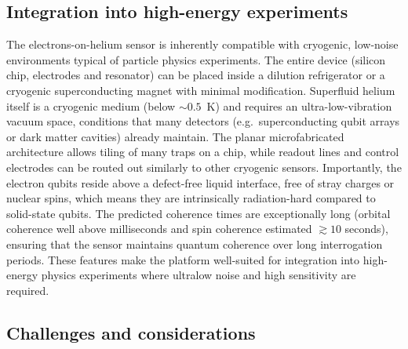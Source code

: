\documentclass[fleqn,10pt]{wlscirep}
\begin{document}
\subsection{Integration into high-energy experiments}

The electrons-on-helium sensor is inherently compatible with cryogenic, low-noise environments typical of particle physics experiments.  The entire device (silicon chip, electrodes and resonator) can be placed inside a dilution refrigerator or a cryogenic superconducting magnet with minimal modification.  Superfluid helium itself is a cryogenic medium (below $\sim0.5$~K) and requires an ultra-low-vibration vacuum space, conditions that many detectors (e.g.\ superconducting qubit arrays or dark matter cavities) already maintain.  The planar microfabricated architecture allows tiling of many traps on a chip, while readout lines and control electrodes can be routed out similarly to other cryogenic sensors.  Importantly, the electron qubits reside above a defect-free liquid interface, free of stray charges or nuclear spins, which means they are intrinsically radiation-hard compared to solid-state qubits.  The predicted coherence times are exceptionally long (orbital coherence well above milliseconds and spin coherence estimated $\gtrsim10$ seconds), ensuring that the sensor maintains quantum coherence over long interrogation periods.  These features make the platform well-suited for integration into high-energy physics experiments where ultralow noise and high sensitivity are required.

\subsection{Challenges and considerations}
\end{document}

